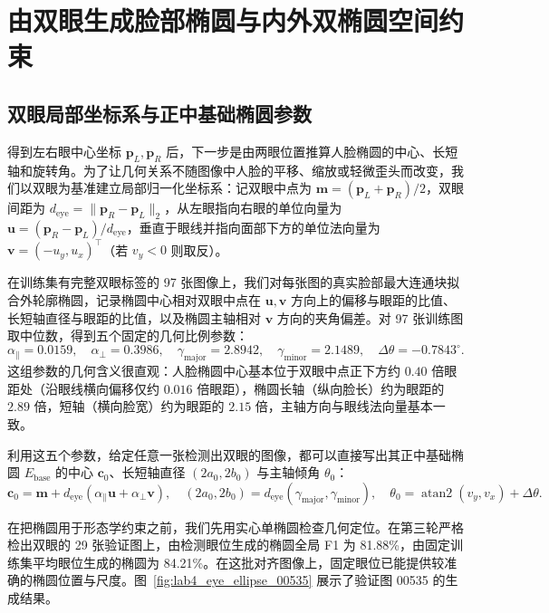 \section{由双眼生成脸部椭圆与内外双椭圆空间约束}\label{sec:dual_ellipse}

\subsection{双眼局部坐标系与正中基础椭圆参数}

得到左右眼中心坐标 $\mathbf{p}_L, \mathbf{p}_R$ 后，下一步是由两眼位置推算人脸椭圆的中心、长短轴和旋转角。为了让几何关系不随图像中人脸的平移、缩放或轻微歪头而改变，我们以双眼为基准建立局部归一化坐标系：记双眼中点为 $\mathbf{m}=(\mathbf{p}_L+\mathbf{p}_R)/2$，双眼间距为 $d_{\text{eye}}=\|\mathbf{p}_R-\mathbf{p}_L\|_2$，从左眼指向右眼的单位向量为 $\mathbf{u}=(\mathbf{p}_R-\mathbf{p}_L)/d_{\text{eye}}$，垂直于眼线并指向面部下方的单位法向量为 $\mathbf{v}=(-u_y, u_x)^\top$（若 $v_y<0$ 则取反）。

在训练集有完整双眼标签的 97 张图像上，我们对每张图的真实脸部最大连通块拟合外轮廓椭圆，记录椭圆中心相对双眼中点在 $\mathbf{u}, \mathbf{v}$ 方向上的偏移与眼距的比值、长短轴直径与眼距的比值，以及椭圆主轴相对 $\mathbf{v}$ 方向的夹角偏差。对 97 张训练图取中位数，得到五个固定的几何比例参数：
\begin{equation}
\alpha_\parallel = 0.0159,\quad
\alpha_\perp = 0.3986,\quad
\gamma_{\text{major}} = 2.8942,\quad
\gamma_{\text{minor}} = 2.1489,\quad
\Delta\theta = -0.7843^\circ.
\label{eq:geomprior}
\end{equation}
这组参数的几何含义很直观：人脸椭圆中心基本位于双眼中点正下方约 $0.40$ 倍眼距处（沿眼线横向偏移仅约 $0.016$ 倍眼距），椭圆长轴（纵向脸长）约为眼距的 $2.89$ 倍，短轴（横向脸宽）约为眼距的 $2.15$ 倍，主轴方向与眼线法向量基本一致。

利用这五个参数，给定任意一张检测出双眼的图像，都可以直接写出其正中基础椭圆 $E_{\text{base}}$ 的中心 $\mathbf{c}_0$、长短轴直径 $(2a_0, 2b_0)$ 与主轴倾角 $\theta_0$：
\begin{equation}
\mathbf{c}_0 = \mathbf{m} + d_{\text{eye}}(\alpha_\parallel\mathbf{u} + \alpha_\perp\mathbf{v}),\quad
(2a_0, 2b_0) = d_{\text{eye}}(\gamma_{\text{major}}, \gamma_{\text{minor}}),\quad
\theta_0 = \operatorname{atan2}(v_y, v_x) + \Delta\theta.
\label{eq:baseellipse}
\end{equation}

在把椭圆用于形态学约束之前，我们先用实心单椭圆检查几何定位。在第三轮严格检出双眼的 29 张验证图上，由检测眼位生成的椭圆全局 F1 为 81.88\%，由固定训练集平均眼位生成的椭圆为 84.21\%。在这批对齐图像上，固定眼位已能提供较准确的椭圆位置与尺度。图~\ref{fig:lab4_eye_ellipse_00535} 展示了验证图 00535 的生成结果。

